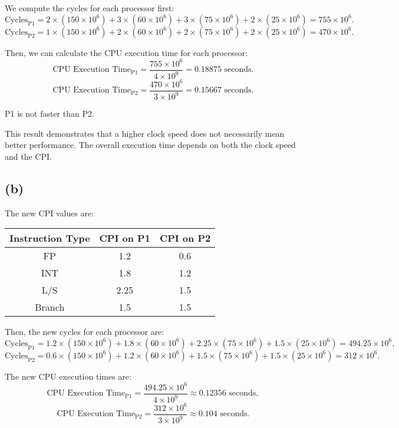 \documentclass[12pt]{article}
\begin{document}
We compute the cycles for each processor first:
$$
\text{Cycles}_{\text{P1}} = 2 \times (150 \times 10^6) + 3 \times (60 \times 10^6) + 3 \times (75 \times 10^6) + 2 \times (25 \times 10^6) = 755 \times 10^6.
$$
$$
\text{Cycles}_{\text{P2}} = 1 \times (150 \times 10^6) + 2 \times (60 \times 10^6) + 2 \times (75 \times 10^6) + 2 \times (25 \times 10^6) = 470 \times 10^6.
$$

Then, we can calculate the CPU execution time for each processor:
$$
\text{CPU Execution Time}_{\text{P1}} = \frac{755 \times 10^6}{4 \times 10^9} = 0.18875\text{ seconds}.
$$
$$
\text{CPU Execution Time}_{\text{P2}} = \frac{470 \times 10^6}{3 \times 10^9} = 0.15667\text{ seconds}.
$$

P1 is not faster than P2.

This result demonstrates that a higher clock speed does not necessarily mean better performance. The overall execution time depends on both the clock speed and the CPI.

\subsection*{(b)}

The new CPI values are:
\begin{center}
    \begin{tabular}{|c|c|c|}
    \hline
    \textbf{Instruction Type} & \textbf{CPI on P1} & \textbf{CPI on P2} \\
    \hline
    FP & 1.2 & 0.6 \\
    \hline
    INT & 1.8 & 1.2 \\
    \hline
    L/S & 2.25 & 1.5 \\
    \hline
    Branch & 1.5 & 1.5 \\
    \hline
    \end{tabular}
\end{center}

Then, the new cycles for each processor are:
$$
\text{Cycles}_{\text{P1}} = 1.2 \times (150 \times 10^6) + 1.8 \times (60 \times 10^6) + 2.25 \times (75 \times 10^6) + 1.5 \times (25 \times 10^6) = 494.25 \times 10^6,
$$
$$
\text{Cycles}_{\text{P2}} = 0.6 \times (150 \times 10^6) + 1.2 \times (60 \times 10^6) + 1.5 \times (75 \times 10^6) + 1.5 \times (25 \times 10^6) = 312 \times 10^6.
$$

The new CPU execution times are:
$$
\text{CPU Execution Time}_{\text{P1}} = \frac{494.25 \times 10^6}{4 \times 10^9} \approx 0.12356\text{ seconds},
$$
$$
\text{CPU Execution Time}_{\text{P2}} = \frac{312 \times 10^6}{3 \times 10^9} \approx 0.104\text{ seconds}.
$$
\end{document}
